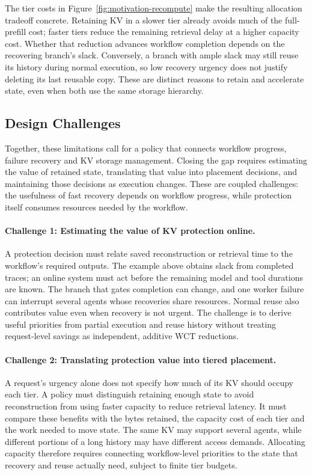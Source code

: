 \label{sec:motivation-long-context}
The tier costs in Figure~\ref{fig:motivation-recompute} make the resulting
allocation tradeoff concrete. Retaining KV in a slower tier already
avoids much of the full-prefill cost; faster tiers reduce the remaining
retrieval delay at a higher capacity cost. Whether that reduction
advances workflow completion depends on the recovering branch's slack.
Conversely, a branch with ample slack may still reuse its history during
normal execution, so low recovery urgency does not justify deleting its
last reusable copy. These are distinct reasons to retain and accelerate
state, even when both use the same storage hierarchy.

\subsection{Design Challenges}
\label{sec:motivation-challenges}

Together, these limitations call for a policy that connects workflow
progress, failure recovery and KV storage management. Closing the gap
requires estimating the value of retained state, translating that value
into placement decisions, and maintaining those decisions as execution
changes. These are coupled challenges: the usefulness of fast recovery
depends on workflow progress, while protection itself consumes resources
needed by the workflow.

\paragraph{Challenge 1: Estimating the value of KV protection online.}
A protection decision must relate saved reconstruction or retrieval time
to the workflow's required outputs. The example above obtains slack from
completed traces; an online system must act before the remaining model
and tool durations are known. The branch that gates completion can
change, and one worker failure can interrupt several agents whose
recoveries share resources. Normal reuse also contributes value even
when recovery is not urgent. The challenge is to derive useful priorities
from partial execution and reuse history without treating request-level
savings as independent, additive WCT reductions.

\paragraph{Challenge 2: Translating protection value into tiered placement.}
A request's urgency alone does not specify how much of its KV should
occupy each tier. A policy must distinguish retaining enough state to
avoid reconstruction from using faster capacity to reduce retrieval
latency. It must compare these benefits with the bytes retained, the
capacity cost of each tier and the work needed to move state.
The same KV may support several agents, while different portions of a
long history may have different access demands. Allocating capacity
therefore requires connecting workflow-level priorities to the state
that recovery and reuse actually need, subject to finite tier budgets.

